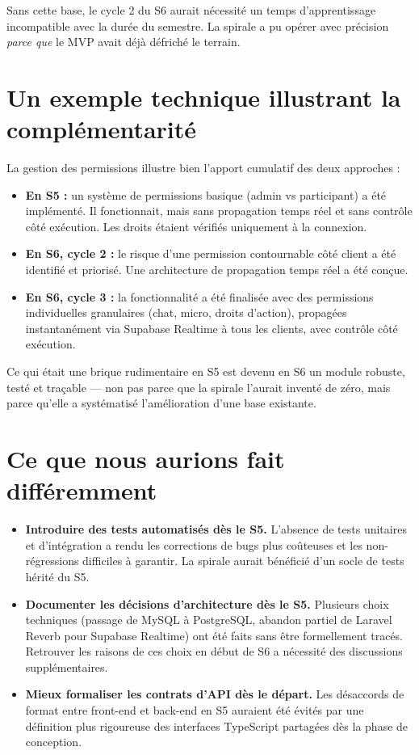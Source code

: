 \documentclass[11pt,a4paper]{report}
\begin{document}
Sans cette base, le cycle 2 du S6 aurait nécessité un temps d'apprentissage incompatible avec la durée du semestre. La spirale a pu opérer avec précision \textit{parce que} le MVP avait déjà défriché le terrain.

\section{Un exemple technique illustrant la complémentarité}

La gestion des permissions illustre bien l'apport cumulatif des deux approches :

\begin{itemize}
    \item \textbf{En S5 :} un système de permissions basique (admin vs participant) a été implémenté. Il fonctionnait, mais sans propagation temps réel et sans contrôle côté exécution. Les droits étaient vérifiés uniquement à la connexion.
    \item \textbf{En S6, cycle 2 :} le risque d'une permission contournable côté client a été identifié et priorisé. Une architecture de propagation temps réel a été conçue.
    \item \textbf{En S6, cycle 3 :} la fonctionnalité a été finalisée avec des permissions individuelles granulaires (chat, micro, droits d'action), propagées instantanément via Supabase Realtime à tous les clients, avec contrôle côté exécution.
\end{itemize}

Ce qui était une brique rudimentaire en S5 est devenu en S6 un module robuste, testé et traçable --- non pas parce que la spirale l'aurait inventé de zéro, mais parce qu'elle a systématisé l'amélioration d'une base existante.

\section{Ce que nous aurions fait différemment}

\begin{itemize}
    \item \textbf{Introduire des tests automatisés dès le S5.} L'absence de tests unitaires et d'intégration a rendu les corrections de bugs plus coûteuses et les non-régressions difficiles à garantir. La spirale aurait bénéficié d'un socle de tests hérité du S5.
    \item \textbf{Documenter les décisions d'architecture dès le S5.} Plusieurs choix techniques (passage de MySQL à PostgreSQL, abandon partiel de Laravel Reverb pour Supabase Realtime) ont été faits sans être formellement tracés. Retrouver les raisons de ces choix en début de S6 a nécessité des discussions supplémentaires.
    \item \textbf{Mieux formaliser les contrats d'API dès le départ.} Les désaccords de format entre front-end et back-end en S5 auraient été évités par une définition plus rigoureuse des interfaces TypeScript partagées dès la phase de conception.
\end{itemize}
\end{document}
